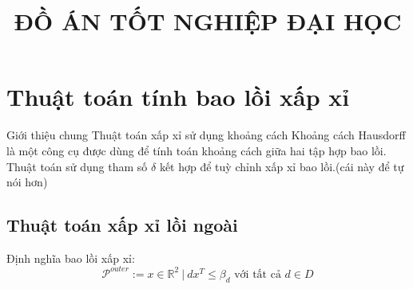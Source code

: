 \documentclass[11pt]{beamer}
\title[ \footnotesize  \textcolor{red}{\bf Đồ án tốt nghiệp} -- \textcolor{blue}{Trần Xuân Độ }]{\Large  \bf ĐỒ ÁN TỐT NGHIỆP ĐẠI HỌC}
\institute{\bf  Hà Nội, tháng 12 năm 2023}
\theoremstyle{definition}
\theoremstyle{plain}
\theoremstyle{plain}
\theoremstyle{remark}
\begin{document}


	\section{Thuật toán tính bao lồi xấp xỉ}

	\begin{frame}{Giới thiệu chung}
		Thuật toán xấp xỉ sử dụng khoảng cách Khoảng cách Hausdorff là một công cụ được dùng để tính toán khoảng cách giữa hai tập hợp bao lồi.
		Thuật toán sử dụng tham số $\delta$ kết hợp để tuỳ chỉnh xấp xỉ bao lồi.(cái này để tự nói hơn)
		
	\end{frame}	
		\subsection{Thuật toán xấp xỉ lồi ngoài}
	\begin{frame}
	Định nghĩa bao lồi xấp xỉ:
	\begin{equation}
		\mathcal{P}^{outer} := {x \in \mathbb{R}^2 \ | \ d x^T \leq \beta_d \text{ với tất cả } d \in D}
		\end{equation}
		
	\end{frame}
\end{document}
